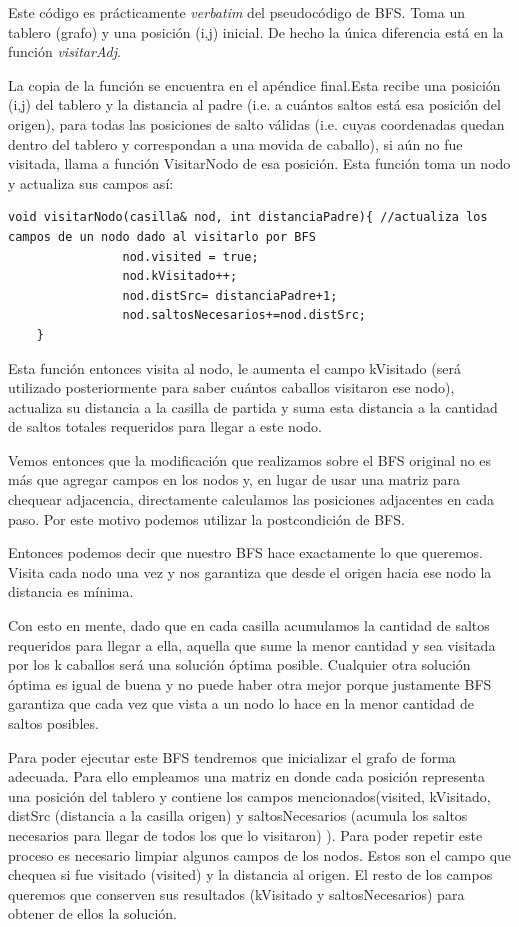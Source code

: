 \documentclass[11pt, a4paper, twoside]{article}
\begin{document}
Este código es prácticamente \textit{verbatim} del pseudocódigo de BFS. Toma un tablero (grafo) y una posición (i,j) inicial. De hecho la única diferencia está en la función \textit{visitarAdj}. 

La copia de la función se encuentra en el apéndice final.Esta recibe una posición (i,j) del tablero y la distancia al padre (i.e. a cuántos saltos está esa posición del origen), para todas las posiciones de salto válidas (i.e. cuyas coordenadas quedan dentro del tablero y correspondan a una movida de caballo), si aún no fue visitada, llama a función VisitarNodo de esa posición. Esta función toma un nodo y actualiza sus campos así:

\begin{verbatim}
void visitarNodo(casilla& nod, int distanciaPadre){ //actualiza los campos de un nodo dado al visitarlo por BFS
	            nod.visited = true;
                nod.kVisitado++;
                nod.distSrc= distanciaPadre+1;
                nod.saltosNecesarios+=nod.distSrc;
	}
\end{verbatim}

Esta función entonces visita al nodo, le aumenta el campo kVisitado (será utilizado posteriormente para saber cuántos caballos visitaron ese nodo), actualiza su distancia a la casilla de partida y suma esta distancia a la cantidad de saltos totales requeridos para llegar a este nodo. 

Vemos entonces que la modificación que realizamos sobre el BFS original no es más que agregar campos en los nodos y, en lugar de usar una matriz para chequear adjacencia, directamente calculamos las posiciones adjacentes en cada paso. Por este motivo podemos utilizar la postcondición de BFS.

Entonces podemos decir que nuestro BFS hace exactamente lo que queremos. Visita cada nodo una vez y nos garantiza que desde el origen hacia ese nodo la distancia es mínima. 

Con esto en mente, dado que en cada casilla acumulamos la cantidad de saltos requeridos para llegar a ella, aquella que sume la menor cantidad y sea visitada por los k caballos será una solución óptima posible. Cualquier otra solución óptima es igual de buena y no puede haber otra mejor porque justamente BFS garantiza que cada vez que vista a un nodo lo hace en la menor cantidad de saltos posibles.

Para poder ejecutar este BFS tendremos que inicializar el grafo de forma adecuada. Para ello empleamos una matriz en donde cada posición representa una posición del tablero y contiene los campos mencionados(visited, kVisitado, distSrc (distancia a la casilla origen) y saltosNecesarios (acumula los saltos necesarios para llegar de todos los que lo visitaron) ).
Para poder repetir este proceso es necesario limpiar algunos campos de los nodos. Estos son el campo que chequea si fue visitado (visited) y la distancia al origen. El resto de los campos queremos que conserven sus resultados (kVisitado y saltosNecesarios) para obtener de ellos la solución.  
\end{document}
